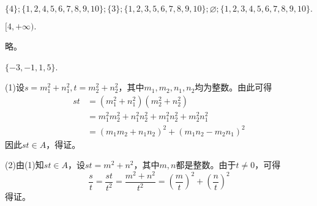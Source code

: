 \documentclass[lang=cn,newtx,10pt,scheme=chinese]{elegantbook}
\begin{document}
\begin{exercise}
  $\{4\};\{1,2,4,5,6,7,8,9,10\};\{3\};\{1,2,3,5,6,7,8,9,10\};\varnothing ;\{1,2,3,4,5,6,7,8,9,10\}.$
\end{exercise}
\begin{exercise}
  $[4,+\infty).$
\end{exercise}
\begin{exercise}
  略。
\end{exercise}
\begin{exercise}
  $\{-3,-1,1,5\}$.
\end{exercise}
\begin{exercise}
  (1)设$s=m_1^2+n_1^2,t=m_2^2+n_2^2$，其中$m_1,m_2,n_1,n_2$均为整数。由此可得
  $$\begin{aligned}
    st& =(m_1^2+n_1^2)(m_2^2+n_2^2)  \\
    &=m_1^2m_2^2+n_1^2n_2^2+m_1^2n_2^2+m_2^2n_1^2 \\
    &=(m_1m_2+n_1n_2)^2+(m_1n_2-m_2n_1)^2
    \end{aligned}$$
  因此$st\in A$，得证。
  
  (2)由(1)知$st \in A$，设$st=m^2+n^2$，其中$m,n$都是整数。由于$t\neq 0$，可得$$\frac st=\frac{st}{t^2}=\frac{m^2+n^2}{t^2}=\left(\frac mt\right)^2+\left(\frac nt\right)^2$$
  得证。
\end{exercise}
\end{document}
